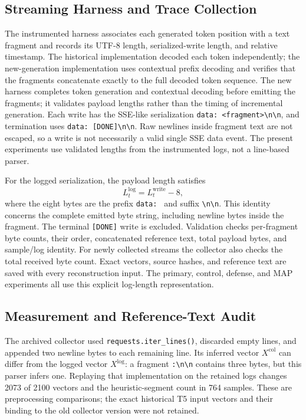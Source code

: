 \documentclass[electronics,article,submit,pdftex,moreauthors]{Definitions/mdpi}
\begin{document}
\subsection{Streaming Harness and Trace Collection}
The instrumented harness associates each generated token position with a text fragment and records its UTF-8 length, serialized-write length, and relative timestamp. The historical implementation decoded each token independently; the new-generation implementation uses contextual prefix decoding and verifies that the fragments concatenate exactly to the full decoded token sequence. The new harness completes token generation and contextual decoding before emitting the fragments; it validates payload lengths rather than the timing of incremental generation. Each write has the SSE-like serialization \texttt{data: \textless fragment\textgreater\textbackslash n\textbackslash n}, and termination uses \texttt{data: [DONE]\textbackslash n\textbackslash n}. Raw newlines inside fragment text are not escaped, so a write is not necessarily a valid single SSE data event. The present experiments use validated lengths from the instrumented logs, not a line-based parser.

For the logged serialization, the payload length satisfies
\begin{equation}
L^{\mathrm{log}}_t = L^{\mathrm{write}}_t - 8,
\end{equation}
where the eight bytes are the prefix \texttt{data: } and suffix \texttt{\textbackslash n\textbackslash n}. This identity concerns the complete emitted byte string, including newline bytes inside the fragment. The terminal \texttt{[DONE]} write is excluded. Validation checks per-fragment byte counts, their order, concatenated reference text, total payload bytes, and sample/log identity. For newly collected streams the collector also checks the total received byte count. Exact vectors, source hashes, and reference text are saved with every reconstruction input. The primary, control, defense, and MAP experiments all use this explicit log-length representation.

\subsection{Measurement and Reference-Text Audit}\label{sec:measurement-audit}
The archived collector used \texttt{requests.iter\_lines()}, discarded empty lines, and appended two newline bytes to each remaining line. Its inferred vector $X^{\mathrm{col}}$ can differ from the logged vector $X^{\mathrm{log}}$: a fragment \texttt{:\textbackslash n\textbackslash n} contains three bytes, but this parser infers one. Replaying that implementation on the retained logs changes 2073 of 2100 vectors and the heuristic-segment count in 764 samples. These are preprocessing comparisons; the exact historical T5 input vectors and their binding to the old collector version were not retained.
\end{document}
